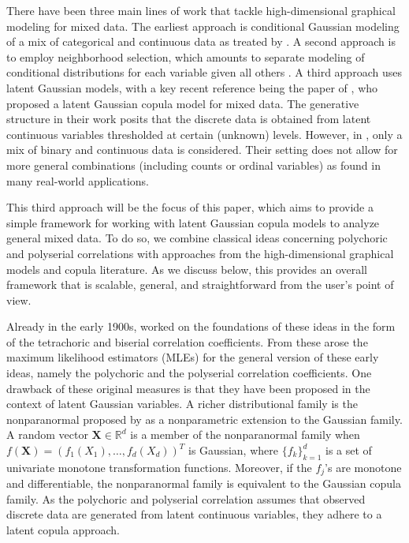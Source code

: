 There have been three main lines of work that tackle high-dimensional graphical modeling for mixed data. The earliest approach is conditional Gaussian modeling of a mix of categorical and continuous data \cite{Lauritzen96} as treated by \citet{Cheng17, Lee15}. A second approach is to employ neighborhood selection, which amounts to separate modeling of conditional distributions for each variable given all others \cite[see, e.g.][]{Chen15, Yang14, Yang19}. A third approach uses latent Gaussian models, with a key recent reference being the paper of \citet{Fan17}, who proposed a latent Gaussian copula model for mixed data. The generative structure in their work posits that the discrete data is obtained from latent continuous variables thresholded at certain (unknown) levels.  However, in \cite{Fan17}, only a mix of binary and continuous data is considered. Their setting does not allow for more general combinations (including counts or ordinal variables) as found in many real-world applications.

This third approach will be the focus of this paper, which aims to provide a simple framework for working with latent Gaussian copula models to analyze general mixed data. To do so, we combine classical ideas concerning polychoric and polyserial correlations with approaches from the high-dimensional graphical models and copula literature. As we discuss below, this provides an overall framework that is scalable, general, and straightforward from the user's point of view.

Already in the early 1900s, \citet{Pearson1900, Pearson13} worked on the foundations of these ideas in the form of the tetrachoric and biserial correlation coefficients. From these arose the maximum likelihood estimators (MLEs) for the general version of these early ideas, namely the polychoric and the polyserial correlation coefficients. One drawback of these original measures is that they have been proposed in the context of latent Gaussian variables. A richer distributional family is the nonparanormal proposed by \citet{Liu09} as a nonparametric extension to the Gaussian family. A random vector $\boldsymbol{X} \in \mathbb{R}^d$ is a member of the nonparanormal family when $f(\boldsymbol{X}) = (f_{1}(X_{1}), \dots, f_{d}(X_{d}))^{T}$ is Gaussian, where $\{f_{k}\}_{k=1}^{d}$ is a set of univariate monotone transformation functions. Moreover, if the $f_j$'s are monotone and differentiable, the nonparanormal family is equivalent to the Gaussian copula family. As the polychoric and polyserial correlation assumes that observed discrete data are generated from latent continuous variables, they adhere to a latent copula approach.

